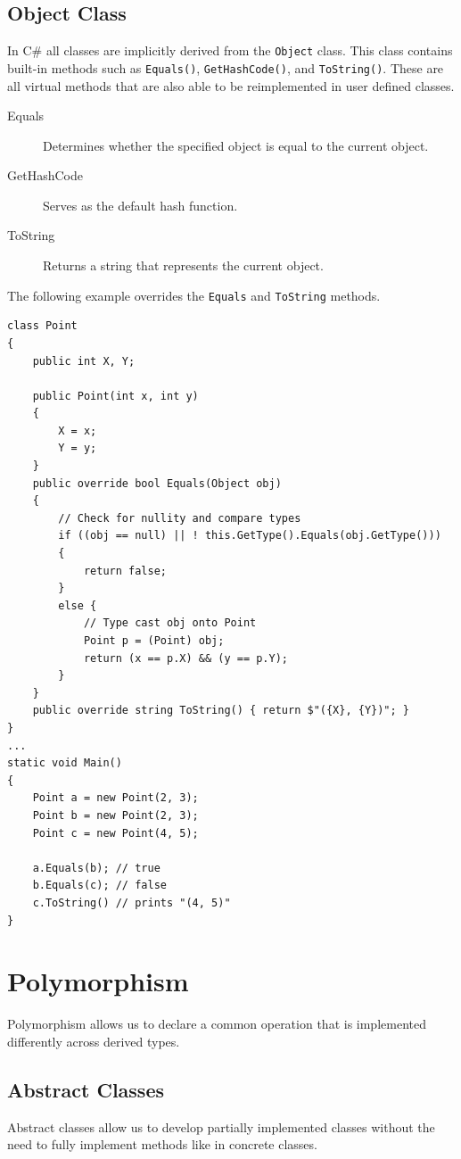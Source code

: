 \documentclass{article}
\begin{document}
\subsection{Object Class}
In C\# all classes are implicitly derived from the \lstinline{Object} class. This class contains built-in methods
such as \lstinline{Equals()}, \lstinline{GetHashCode()}, and \lstinline{ToString()}. These are all virtual methods that
are also able to be reimplemented in user defined classes. 
\begin{description}
    \item[Equals] Determines whether the specified object is equal to the current object.
    \item[GetHashCode] Serves as the default hash function.
    \item[ToString] Returns a string that represents the current object.  
\end{description}
The following example overrides the \lstinline{Equals} and \lstinline{ToString} methods.
\begin{lstlisting}
class Point
{
    public int X, Y;

    public Point(int x, int y) 
    {
        X = x;
        Y = y;
    }
    public override bool Equals(Object obj) 
    {
        // Check for nullity and compare types
        if ((obj == null) || ! this.GetType().Equals(obj.GetType()))
        {
            return false;
        }
        else {
            // Type cast obj onto Point 
            Point p = (Point) obj;
            return (x == p.X) && (y == p.Y);
        }
    }
    public override string ToString() { return $"({X}, {Y})"; }
}
...
static void Main()
{
    Point a = new Point(2, 3);
    Point b = new Point(2, 3);
    Point c = new Point(4, 5);

    a.Equals(b); // true
    b.Equals(c); // false
    c.ToString() // prints "(4, 5)"
}
\end{lstlisting}
\section{Polymorphism}
Polymorphism allows us to declare a common operation that is implemented differently across derived types.
\subsection{Abstract Classes}
Abstract classes allow us to develop partially implemented classes without 
the need to fully \linebreak implement methods like in concrete classes. 
\end{document}
